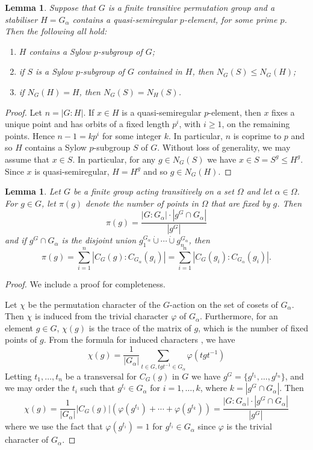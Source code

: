\documentclass{article}
\newtheorem{lem}[thm]{Lemma}
\theoremstyle{remark}
\theoremstyle{definition}
\newcommand{\qsr}{quasi-semiregular}
\begin{document}
\begin{lem}\label{lem: qs and sylow} 
Suppose that $G$ is a finite transitive permutation group and a stabiliser $H=G_\alpha$ contains a {\qsr} {  $p$-element, for some prime $p$}. Then the following all hold: 
\begin{enumerate}[(1)]
\item $H$ contains a  Sylow $p$-subgroup of $G$;
\item  if $S$  is a Sylow $p$-subgroup of $G$ contained in $H$, then $N_G(S) \leqslant N_G(H)$;
\item if $N_G(H) =H$, then $N_G(S) = N_H(S)$.
\end{enumerate}
\end{lem}
\begin{proof}
Let $n=|G:H|$. If $x\in H$ is a {\qsr} {  $p$-element}, then $x$ fixes a unique point and has orbits of a fixed length {  $p^i$, with $i\geqslant 1$, on the remaining points. Hence $n-1 = kp^i$ for some integer $k$. In particular, $n$} is coprime to $p$ and so $H$ contains a Sylow $p$-subgroup $S$ of $G$. Without loss of generality, we may assume that $x \in S$. In particular, for any $g\in N_G(S)$ we have $x \in S  = S^g \leqslant H^g$. Since $x$ is {\qsr}, $H=H^g$ and so $g\in N_G(H)$.
\end{proof}

\begin{lem}
\label{lem: x is qsres}
    Let $G$ be a finite group acting transitively
on a set $\Omega$ and let $\alpha\in \Omega $. For $g\in G$, let $\pi(g)$ denote the number of  points in $\Omega$ that are fixed by $g$. Then 
    $$\pi(g) = \frac{|G:G_\alpha |\cdot|g^G \cap G_\alpha|}{|g^G|}$$
    and if $g^G \cap G_\alpha$ is the disjoint union   $g_1^{G_\alpha} \dot\cup \cdots \dot\cup g_n^{G_\alpha}$, then
    \[\pi(g) = \sum_{i=1}^n |C_G(g) : C_{G_\alpha}(g_i)|= \sum_{i=1}^n |C_G(g_i ) : C_{G_\alpha}(g_i)|. \]
\end{lem}
\begin{proof}
We include a proof for completeness.

Let $\chi$ be the permutation character of the $G$-action on the set of  cosets of $G_\alpha$. Then $\chi$ is  induced from the trivial character $\varphi$ of $G_\alpha$. Furthermore, for an element $g\in G$, $\chi(g)$ is the trace of the matrix of $g$, which is the number of fixed points of $g$. From the formula for induced characters \cite[Definition (5.1)]{Isaacs}, we have
\[
\chi(g) =\frac{1}{|G_\alpha|} \sum_{t\in G, tgt^{-1} \in G_\alpha} \varphi(tgt^{-1})
\]
Letting $t_1,\ldots,t_n$ be a transversal for $C_G(g)$ in $G$ we have $g^G = \{g^{t_1},\ldots,g^{t_n}\}$, and we may order the $t_i$ such that $g^{t_i} \in G_\alpha$ for $i=1,\ldots, k$, where $k=|g^G\cap G_\alpha|$. Then 
\[
\chi(g) =\frac{1}{|G_\alpha|} |C_G(g)| (\varphi(g^{t_1})+\cdots+\varphi(g^{t_k})) = \frac{|G : G_\alpha| \cdot |g^G \cap G_\alpha|}{|g^G|} 
\]
where we use the fact that $\varphi(g^{t_i})=1$ for $g^{t_i} \in G_\alpha$ since $\varphi$ is the trivial character of $G_\alpha$.
\end{proof}
\end{document}
